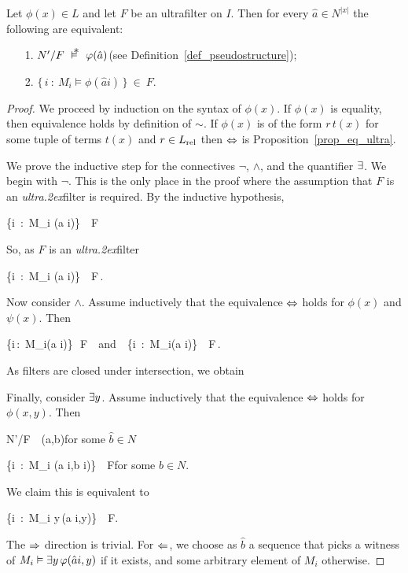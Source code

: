 \documentclass[creche.tex]{subfiles}
\begin{document}
\begin{void_thm}[\L o\'{s}'s Theorem]\label{thm_los}
Let $\phi(x)\in L$ and let $F$ be an ultrafilter on $I$. Then for every $\hat a\in N^{|x|}$ the following are equivalent:
\begin{itemize}
\item[1.] $N'/F\ \pmodels\ \phi(\hat a)$\hfill (see  Definition~\ref{def_pseudostructure});
\item[2.] $\big\{\,i\ :\ M_i\models \phi(\hat a i)\,\big\}\ \in\ F$.
\end{itemize}
\end{void_thm}

\begin{proof}
We proceed by induction on the syntax of $\phi(x)$. 
If $\phi(x)$ is equality, then equivalence holds by definition of $\sim$. 
If $\phi(x)$ is of the form $r\,t(x)$ for some tuple of terms $t(x)$ and $r\in L_{\rm rel}$ then $\Leftrightarrow$ is Proposition~\ref{prop_eq_ultra}.

We prove the inductive step for the connectives $\neg$, $\wedge$, and the quantifier $\exists$. We begin with $\neg$. This is the only place in the proof where the assumption that $F$ is an \textit{ultra\kern.2ex}filter is required. By the inductive hypothesis,

%
{\IFF}%
{\big\{i\ :\ M_i\; \models\; \phi(\hat a i)\;\big\}\ \notin\ F}

So, as $F$ is an \textit{ultra\kern.2ex}filter

\ceq{}{\IFF}%
{\big\{i\ :\ M_i\; \models\; \neg\phi(\hat a i)\;\big\}\ \in\ F\,.}

Now consider $\wedge$. Assume inductively that the equivalence $\Leftrightarrow$ holds for $\phi(x)$ and $\psi(x)$. Then

%
{\IFF}%
{\big\{i\,:\, M_i\models\phi(\hat a i)\big\}\,\in\, F\ \ {\rm and}\ \ \big\{i\, :\, M_i\models\psi(\hat a i)\big\}\, \in\, F\,.}

As filters are closed under intersection, we obtain


Finally, consider $\exists y$.  Assume inductively that the equivalence $\Leftrightarrow$ holds for $\phi(x,y)$. Then

%
{\IFF}%
{N'/F\ \pmodels\  \phi\big(\hat a,\hat b\big)}\hfill for some $\hat b\in N$\phantom{.}

\ceq{}{\IFF}%
{\big\{i\ :\ M_i\; \models\; \phi(\hat a i,\hat b i)\;\big\}\ \in\ F}\hfill for some $\hat b\in N$.

We claim this is equivalent to

\ceq{}{\IFF}%
{\big\{i\ :\ M_i\; \models\; \E y\,\phi(\hat a i,y)\;\big\}\ \in\ F.}

The $\Rightarrow$ direction is trivial. For $\Leftarrow$, we choose as $\hat b$ a sequence that picks a witness of $M_i\vDash\exists y\,\varphi(\hat a i,y)$ if it exists, and some arbitrary element of $M_i$ otherwise.
\end{proof}
\end{document}
